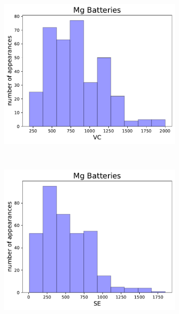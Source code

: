\begin{figure}[h]
\begin{subfigure}{0.3\textwidth}
         \caption{}
     \end{subfigure}
          ~ 
     \begin{subfigure}{0.3\textwidth}
         \centering
         \includegraphics[width=\linewidth]{result/figures/columnsplotMg_VC.pdf}
         \caption{}
     \end{subfigure}
          ~ 
     \begin{subfigure}{0.3\textwidth}
         \centering
         \includegraphics[width=\linewidth]{result/figures/columnsplotMg_SE.pdf}
         \caption{}
     \end{subfigure}

\end{figure}
